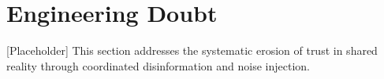\chapter{Engineering Doubt}
[Placeholder] This section addresses the systematic erosion of trust in shared
 reality through coordinated disinformation and noise injection.

